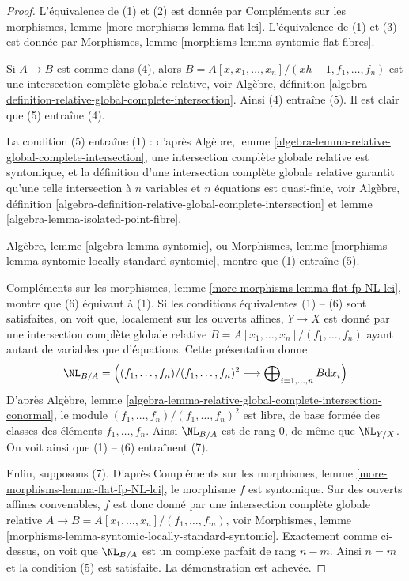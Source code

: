 \begin{proof}
L'équivalence de (1) et (2) est donnée par
Compléments sur les morphismes, lemme \ref{more-morphisms-lemma-flat-lci}.
L'équivalence de (1) et (3) est donnée par
Morphismes, lemme \ref{morphisms-lemma-syntomic-flat-fibres}.

\medskip\noindent
Si $A \to B$ est comme dans (4), alors
$B = A[x, x_1, \ldots, x_n]/(xh - 1, f_1, \ldots, f_n)$
est une intersection complète globale relative, voir Algèbre, définition
\ref{algebra-definition-relative-global-complete-intersection}.
Ainsi (4) entraîne (5).
Il est clair que (5) entraîne (4).

\medskip\noindent
La condition (5) entraîne (1) : d'après
Algèbre, lemme \ref{algebra-lemma-relative-global-complete-intersection},
une intersection complète globale relative est syntomique, et
la définition d'une intersection complète globale relative
garantit qu'une telle intersection à
$n$ variables et $n$ équations est quasi-finie, voir
Algèbre, définition
\ref{algebra-definition-relative-global-complete-intersection} et
lemme \ref{algebra-lemma-isolated-point-fibre}.

\medskip\noindent
Algèbre, lemme \ref{algebra-lemma-syntomic}, ou
Morphismes, lemme \ref{morphisms-lemma-syntomic-locally-standard-syntomic},
montre que (1) entraîne (5).

\medskip\noindent
Compléments sur les morphismes, lemme \ref{more-morphisms-lemma-flat-fp-NL-lci}, montre que
(6) équivaut à (1). Si les conditions équivalentes (1) -- (6) sont satisfaites,
on voit que, localement sur les ouverts affines, $Y \to X$ est donné par une intersection complète
globale relative $B = A[x_1, \ldots, x_n]/(f_1, \ldots, f_n)$
ayant autant de variables que
d'équations. Cette présentation donne
$$
\NL_{B/A} =\left(
(f_1, \ldots, f_n)/(f_1, \ldots, f_n)^2
\longrightarrow
\bigoplus\nolimits_{i = 1, \ldots, n} B \text{d} x_i\right)
$$
D'après Algèbre, lemme
\ref{algebra-lemma-relative-global-complete-intersection-conormal},
le module $(f_1, \ldots, f_n)/(f_1, \ldots, f_n)^2$
est libre, de base formée des classes des éléments
$f_1, \ldots, f_n$. Ainsi $\NL_{B/A}$ est de rang $0$, de même que $\NL_{Y/X}$.
On voit ainsi que (1) -- (6) entraînent (7).

\medskip\noindent
Enfin, supposons (7). D'après
Compléments sur les morphismes, lemme \ref{more-morphisms-lemma-flat-fp-NL-lci},
le morphisme $f$ est syntomique. Sur des ouverts affines convenables,
$f$ est donc donné par une intersection complète globale relative
$A \to B = A[x_1, \ldots, x_n]/(f_1, \ldots, f_m)$, voir
Morphismes, lemme \ref{morphisms-lemma-syntomic-locally-standard-syntomic}.
Exactement comme ci-dessus, on voit que $\NL_{B/A}$ est un complexe parfait
de rang $n - m$. Ainsi $n = m$ et la condition (5) est satisfaite.
La démonstration est achevée.
\end{proof}

